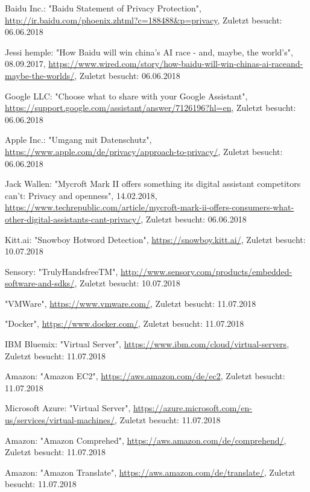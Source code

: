 \documentclass[journal]{IEEEtran}
\begin{document}
\begin{thebibliography}{1}
Baidu Inc.: "Baidu Statement of Privacy Protection", \url{http://ir.baidu.com/phoenix.zhtml?c=188488\&p=privacy},
Zuletzt besucht: 06.06.2018


Jessi hemple: "How Baidu will win china's AI race - and, maybe, the world's", 08.09.2017, \url{https://www.wired.com/story/how-baidu-will-win-chinas-ai-raceand-maybe-the-worlds/},
Zuletzt besucht: 06.06.2018

Google LLC: "Choose what to share with your Google Assistant", \url{https://support.google.com/assistant/answer/7126196?hl=en},
Zuletzt besucht: 06.06.2018

Apple Inc.: "Umgang mit Datenschutz", \url{https://www.apple.com/de/privacy/approach-to-privacy/},
Zuletzt besucht: 06.06.2018

Jack Wallen: "Mycroft Mark II offers something its digital assistant competitors can't: Privacy and openness", 14.02.2018, \url{https://www.techrepublic.com/article/mycroft-mark-ii-offers-consumers-what-other-digital-assistants-cant-privacy/},
Zuletzt besucht: 06.06.2018	
	
Kitt.ai: "Snowboy Hotword Detection",
\url{https://snowboy.kitt.ai/},
Zuletzt besucht: 10.07.2018

Sensory: "TrulyHandsfreeTM",
\url{http://www.sensory.com/products/embedded-software-and-sdks/},
Zuletzt besucht: 10.07.2018

"VMWare",
\url{https://www.vmware.com/},
Zuletzt besucht: 11.07.2018

"Docker",
\url{https://www.docker.com/},
Zuletzt besucht: 11.07.2018

IBM Bluemix: "Virtual Server",
\url{https://www.ibm.com/cloud/virtual-servers},
Zuletzt besucht: 11.07.2018

Amazon: "Amazon EC2",
\url{https://aws.amazon.com/de/ec2},
Zuletzt besucht: 11.07.2018

Microsoft Azure: "Virtual Server",
\url{https://azure.microsoft.com/en-us/services/virtual-machines/},
Zuletzt besucht: 11.07.2018

Amazon: "Amazon Comprehed",
\url{https://aws.amazon.com/de/comprehend/},
Zuletzt besucht: 11.07.2018

Amazon: "Amazon Translate",
\url{https://aws.amazon.com/de/translate/},
Zuletzt besucht: 11.07.2018


\end{thebibliography}
\end{document}
